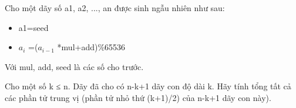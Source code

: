 Cho một dãy số a1, a2, ..., an được sinh ngẫu nhiên như sau:  
\begin{itemize}
	\item     a1=seed   
	\item     $a_{i}$    =($a_{i-1}$    *mul+add)\%65536   
\end{itemize}

   Với mul, add, seed là các số cho trước.  

   Cho một số k ≤ n. Dãy đã cho có n-k+1 dãy con độ dài k. Hãy tính tổng tất cả các phần tử trung vị (phần tử nhỏ thứ (k+1)/2) của n-k+1 dãy con này).